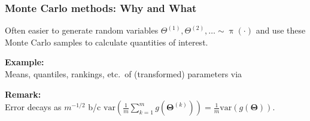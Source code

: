 \documentclass[18pt]{beamer}
\newcommand{\defineTightSpacing}{%
	\setlength{\abovedisplayskip}{.3\baselineskip}%
	\setlength{\belowdisplayskip}{.3\baselineskip}%
}
\newenvironment{tightEquation*}{%
	\defineTightSpacing%
	\begin{equation*}
}{
	\end{equation*} \ignorespacesafterend
}
\newcommand{\thinnerspace}{\mskip.5\thinmuskip}
\newcommand{\probability}{\mathbb{P}}
\DeclareMathOperator{\expectation}{\mathbb{E}}
\newcommand{\indicator}{\mathds{1}}
\DeclareMathOperator{\density}{\pi}
\newcommand{\randVar}{\Theta}
\newcommand{\mcIndex}{k}
\newcommand{\mcSampleSize}{m}
\begin{document}
\begin{frame}
\frametitle{Monte Carlo methods: \textcolor{greyedOutThemecolor}{Why and} What}

Often easier to generate random variables $\randVar^{(1)}, \randVar^{(2)}, \ldots \sim \density(\cdot)$ 
and use these Monte Carlo samples to calculate quantities of interest.

\pause
\textbf{Example:}\\
Means, quantiles, rankings, etc.\ of (transformed) parameters via
\begin{tightEquation*}
\end{tightEquation*}

\pause
\vspace*{-.3\baselineskip}
\textbf{Remark:} \\
Error decays as $\mcSampleSize^{-1/2}$ b/c 
$\mathrm{var} \!\left( \frac{1}{\mcSampleSize} \sum_{\mcIndex = 1}^\mcSampleSize g\left( \bm{\randVar}^{(\mcIndex)} \right) \right)
	= \frac{1}{\mcSampleSize} 
	\mathrm{var} \! \left( g \!\left( \bm{\randVar} \right) \right)$.
\end{frame}
\end{document}
